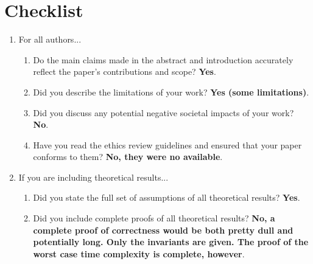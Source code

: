 \documentclass{article}
\begin{document}




\section*{Checklist}

\begin{enumerate}

\item For all authors...
\begin{enumerate}
  \item Do the main claims made in the abstract and introduction accurately reflect the paper's contributions and scope?
    \textbf{Yes}. %
  \item Did you describe the limitations of your work?
    \textbf{Yes (some limitations)}.
  \item Did you discuss any potential negative societal impacts of your work?
		\textbf{No}.
  \item Have you read the ethics review guidelines and ensured that your paper conforms to them?
		\textbf{No, they were no available}.
\end{enumerate}

\item If you are including theoretical results...
\begin{enumerate}
  \item Did you state the full set of assumptions of all theoretical results?
	\textbf{Yes}.
	\item Did you include complete proofs of all theoretical results?
	\textbf{No, a complete proof of correctness would be both pretty dull and potentially long. Only the invariants are given. The proof of the worst case time complexity is complete, however}.
\end{enumerate}


\end{enumerate}
\end{document}
